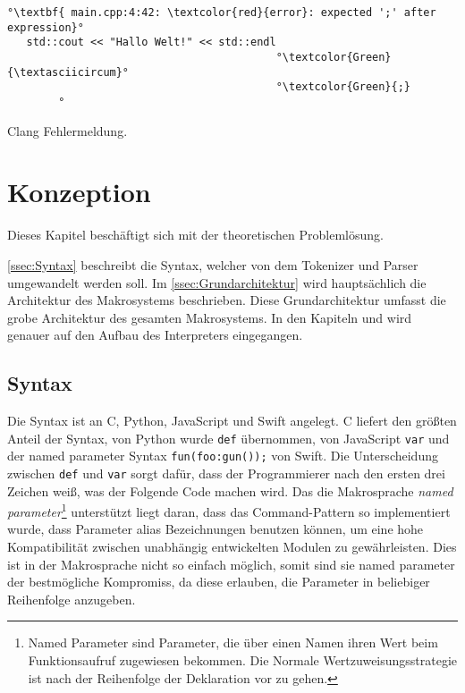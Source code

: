     \begin{myCodeEnv}
      \centering
      \begin{minipage}{.9\textwidth}
        \begin{lstlisting}[keepspaces,escapechar=°,numbers=none]
°\textbf{ main.cpp:4:42: \textcolor{red}{error}: expected ';' after expression}°
   std::cout << "Hallo Welt!" << std::endl
                                          °\textcolor{Green}{\textasciicircum}°
                                          °\textcolor{Green}{;}
        °\end{lstlisting}
      \end{minipage}
      \caption{Clang Fehlermeldung.}
      \label{fig:clang_error}
    \end{myCodeEnv}

\section{Konzeption}
\label{sec:Konzeption}
  Dieses Kapitel beschäftigt sich mit der theoretischen Problemlösung.

  \autoref{ssec:Syntax} beschreibt die Syntax, welcher von dem Tokenizer und Parser umgewandelt werden soll. Im \autoref{ssec:Grundarchitektur} wird hauptsächlich die Architektur des Makrosystems beschrieben. Diese Grundarchitektur umfasst die grobe Architektur des gesamten Makrosystems. In den Kapiteln  und
   wird genauer auf den Aufbau des Interpreters eingegangen.

  \subsection{Syntax}
  \label{ssec:Syntax}
    Die Syntax ist an C, Python, JavaScript und Swift angelegt. C liefert den größten Anteil der Syntax, von Python wurde \lstinline[style=MyMacroStyle]$def$ übernommen, von JavaScript \lstinline[style=MyMacroStyle]$var$ und der named parameter Syntax \lstinline[style=MyMacroStyle]$fun(foo:gun());$ von Swift. Die Unterscheidung zwischen \lstinline[style=MyMacroStyle]$def$ und \lstinline[style=MyMacroStyle]$var$ sorgt dafür, dass der Programmierer nach den ersten drei Zeichen weiß, was der Folgende Code machen wird. Das die Makrosprache \emph{named parameter}\footnote{
      Named Parameter sind Parameter, die über einen Namen ihren Wert beim Funktionsaufruf zugewiesen bekommen. Die Normale Wertzuweisungsstrategie ist nach der Reihenfolge der Deklaration vor zu gehen.
    } unterstützt liegt daran, dass das Command-Pattern so implementiert wurde, dass Parameter alias Bezeichnungen benutzen können, um eine hohe Kompatibilität zwischen unabhängig entwickelten Modulen zu gewährleisten. Dies ist in der Makrosprache nicht so einfach möglich, somit sind sie named parameter der bestmögliche Kompromiss, da diese erlauben, die Parameter in beliebiger Reihenfolge anzugeben.

